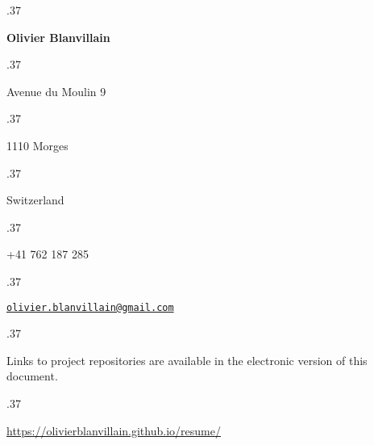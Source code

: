 \documentclass[10pt, margin, a4paper]{res}
\let\link\href
\renewcommand{\href}[2]{\link{#1}{\scriptsize{\faExternalLink}}}
\newcommand{\centered}[1]{\moveleft.37\hoffset\centerline{#1}}
\begin{document}
  \centered{\LARGE\textbf{Olivier Blanvillain}}
  \vspace{3pt}
  \centered{Avenue du Moulin 9}
  \centered{1110 Morges}
  \centered{Switzerland}
  \vspace{3pt}
  \centered{+41 762 187 285}
  \centered{\link{mailto:olivier.blanvillain@gmail.com}{\texttt{olivier.blanvillain@gmail.com}}}

  \begin{resume}
    
  \end{resume}

  \vspace{25pt}

  \centered{\footnotesize Links to project repositories are available in the electronic version of this document.}
  \centered{\footnotesize \url{https://olivierblanvillain.github.io/resume/}}
\end{document}
